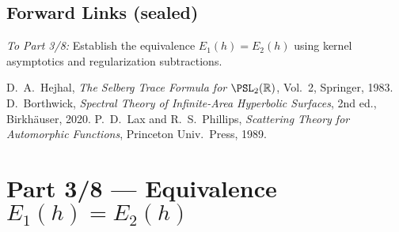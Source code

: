 \subsection*{Forward Links (sealed)}\relax\hspace{0pt}
\noindent
\emph{To Part 3/8:} Establish the equivalence $E_1(h)=E_2(h)$ using kernel asymptotics and regularization subtractions.\relax\hspace{0pt} %

\begin{thebibliography}{9}
 D.~A.~Hejhal, \emph{The Selberg Trace Formula for $\PSL_2(\mathbb{R})$}, Vol.~2, Springer, 1983. %
 D.~Borthwick, \emph{Spectral Theory of Infinite-Area Hyperbolic Surfaces}, 2nd ed., Birkhäuser, 2020. %
 P.~D.~Lax and R.~S.~Phillips, \emph{Scattering Theory for Automorphic Functions}, Princeton Univ.\ Press, 1989. %
\end{thebibliography}


\section*{Part 3/8 — Equivalence $E_{1}(h)=E_{2}(h)$}\relax\hspace{0pt}

